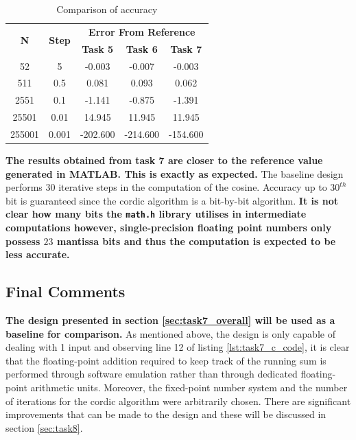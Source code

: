 \documentclass{article}
\begin{document}
\begin{table}[H]
  \centering
    \begin{tabular}{|c|c|c|c|c|}
    \hline
    \multirow{2}[4]{*}{\textbf{N}} & \multirow{2}[4]{*}{\textbf{Step}} & \multicolumn{3}{c|}{\textbf{Error From Reference}} \\
\cline{3-5}          &       & \textbf{Task 5} & \textbf{Task 6} & \textbf{Task 7} \\
    \hline
    52    & 5     & -0.003 & -0.007 & -0.003 \\
    \hline
    511   & 0.5   & 0.081 & 0.093 & 0.062 \\
    \hline
    2551  & 0.1   & -1.141 & -0.875 & -1.391 \\
    \hline
    25501 & 0.01  & 14.945 & 11.945 & 11.945 \\
    \hline
    255001 & 0.001 & -202.600 & -214.600 & -154.600 \\
    \hline
    \end{tabular}%
  \caption{Comparison of accuracy}
  \label{tab:task7_accuracy}%
\end{table}%

\textbf{The results obtained from task 7 are closer to the reference value generated in MATLAB. This is exactly as expected.} The baseline design performs 30 iterative steps in the computation of the cosine. Accuracy up to $30^{th}$ bit is guaranteed since the cordic algorithm is a bit-by-bit algorithm. \textbf{It is not clear how many bits the {\tt math.h} library utilises in intermediate computations however, single-precision floating point numbers only possess $23$ mantissa bits and thus the computation is expected to be less accurate. }

\subsection{Final Comments}

\textbf{The design presented in section \ref{sec:task7_overall} will be used as a baseline for comparison.} As mentioned above, the design is only capable of dealing with 1 input and observing line 12 of listing \ref{lst:task7_c_code}, it is clear that the floating-point addition required to keep track of the running sum is performed through software emulation rather than through dedicated floating-point arithmetic units. Moreover, the fixed-point number system and the number of iterations for the cordic algorithm were arbitrarily chosen. There are significant improvements that can be made to the design and these will be discussed in section \ref{sec:task8}.
\end{document}
